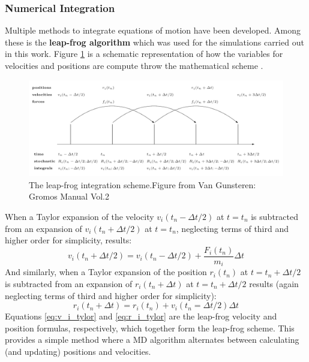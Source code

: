 \subsubsection{Numerical Integration}\label{subsubsec:leapfrog}
Multiple methods to integrate equations of motion have been developed. Among these is the \textbf{leap-frog algorithm} \cite{leach2001molecular} which was used for the simulations carried out in this work. Figure \ref{fig:leapfrog} is a schematic representation of how the variables for velocities and positions are compute throw the mathematical scheme \cite{cuendet2007calculation}. 
\begin{figure}
    \centering
    \includegraphics[scale=0.31]{Figures/Chapter2/Leap_Frog.png}
    \caption{The leap-frog integration scheme.Figure from Van Gunsteren: Gromos Manual Vol.2}
    \label{fig:leapfrog}
\end{figure}
When a Taylor expansion of the velocity $v_i(t_n-\Delta t/2)$ at $t=t_n$ is subtracted from
an expansion of $v_i(t_n+\Delta t/2)$ at $t=t_n$, neglecting terms of third and higher order for simplicity, results: 
\begin{equation}
    v_i(t_n+\Delta t/2) = v_i(t_n-\Delta t/2) + \frac{F_i(t_n)}{m_i}\Delta t
    \label{eq:v_i_tylor}
    \end{equation}
And similarly, when a Taylor expansion of the position $r_i(t_n)$ at $t=t_n + \Delta t/2$ is subtracted from an expansion of $r_i(t_n + \Delta t)$ at $t=t_n + \Delta t/2$ results (again neglecting terms of third and higher order for simplicity):
\begin{equation}
    r_i(t_n + \Delta t)=r_i(t_n) + v_i(t_n = \Delta t/2) \Delta t
    \label{eq:r_i_tylor}
\end{equation}
Equations \ref{eq:v_i_tylor} and \ref{eq:r_i_tylor} are the leap-frog velocity and position formulas, respectively, which together form the leap-frog scheme. This provides a simple method where a MD algorithm alternates between calculating (and updating) positions and velocities.

